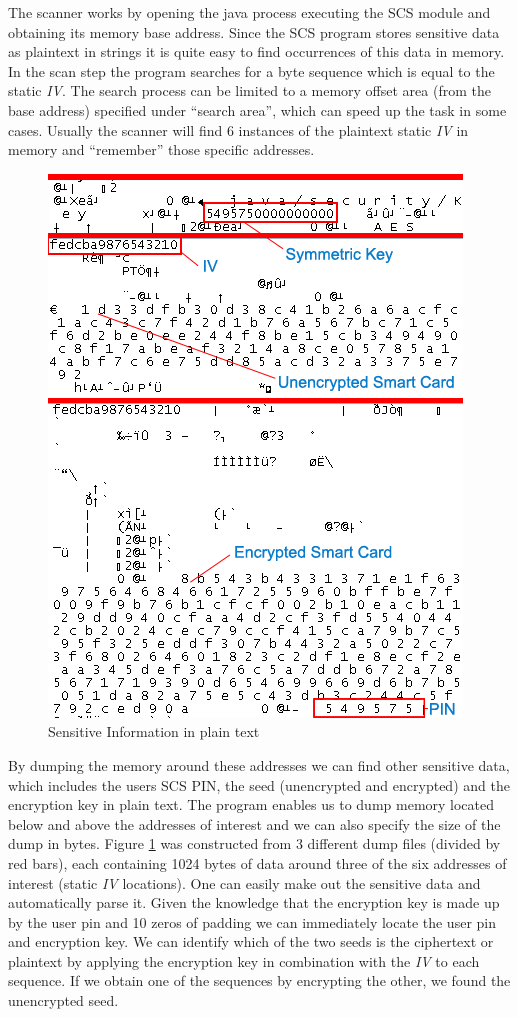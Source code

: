 The scanner works by opening the java process executing the SCS module and obtaining its memory base address. Since the SCS program stores sensitive data as plaintext in strings it is quite easy to find occurrences of this data in memory. In the scan step the program searches for a byte sequence which is equal to the static \emph{IV}. The search process can be limited to a memory offset area (from the base address) specified under ``search area'', which can speed up the task in some cases. Usually the scanner will find 6 instances of the plaintext static \emph{IV} in memory and ``remember'' those specific addresses.
\begin{center}
\begin{figure}[hbtp]
        \centering
        \includegraphics[scale=0.6]{dump.png}
        \caption{Sensitive Information in plain text}\label{figDump}
\end{figure}
\end{center}
By dumping the memory around these addresses we can find other sensitive data, which includes the users SCS PIN, the seed (unencrypted and encrypted) and the encryption key in plain text. The program enables us to dump memory located below and above the addresses of interest and we can also specify the size of the dump in bytes. Figure \ref{figDump} was constructed from 3 different dump files (divided by red bars), each containing 1024 bytes of data around three of the six addresses of interest (static \emph{IV} locations). One can easily make out the sensitive data and automatically parse it. Given the knowledge that the encryption key is made up by the user pin and 10 zeros of padding we can immediately locate the user pin and encryption key. We can identify which of the two seeds is the ciphertext or plaintext by applying the encryption key in combination with the \emph{IV} to each sequence. If we obtain one of the sequences by encrypting the other, we found the unencrypted seed.
